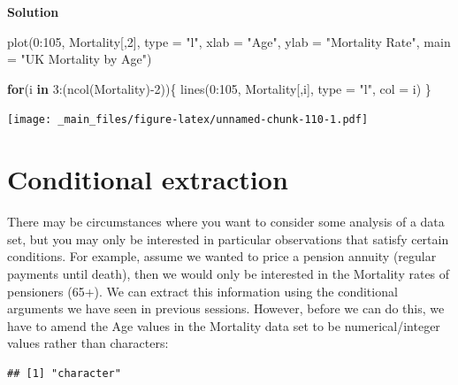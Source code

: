 \documentclass[
]{book}
\newenvironment{Shaded}{\begin{snugshade}}{\end{snugshade}}
\newcommand{\AttributeTok}[1]{\textcolor[rgb]{0.77,0.63,0.00}{#1}}
\newcommand{\ControlFlowTok}[1]{\textcolor[rgb]{0.13,0.29,0.53}{\textbf{#1}}}
\newcommand{\DecValTok}[1]{\textcolor[rgb]{0.00,0.00,0.81}{#1}}
\newcommand{\FunctionTok}[1]{\textcolor[rgb]{0.00,0.00,0.00}{#1}}
\newcommand{\NormalTok}[1]{#1}
\newcommand{\SpecialCharTok}[1]{\textcolor[rgb]{0.00,0.00,0.00}{#1}}
\newcommand{\StringTok}[1]{\textcolor[rgb]{0.31,0.60,0.02}{#1}}
\theoremstyle{definition}
\theoremstyle{definition}
\theoremstyle{definition}
\theoremstyle{definition}
\theoremstyle{remark}
\begin{document}
\textbf{Solution}

\begin{Shaded}
\begin{Highlighting}[]
\FunctionTok{plot}\NormalTok{(}\DecValTok{0}\SpecialCharTok{:}\DecValTok{105}\NormalTok{, Mortality[,}\DecValTok{2}\NormalTok{], }\AttributeTok{type =} \StringTok{"l"}\NormalTok{, }\AttributeTok{xlab =} \StringTok{"Age"}\NormalTok{, }\AttributeTok{ylab =} \StringTok{"Mortality Rate"}\NormalTok{, }\AttributeTok{main =} \StringTok{"UK Mortality by Age"}\NormalTok{)}

\ControlFlowTok{for}\NormalTok{(i }\ControlFlowTok{in} \DecValTok{3}\SpecialCharTok{:}\NormalTok{(}\FunctionTok{ncol}\NormalTok{(Mortality)}\SpecialCharTok{{-}}\DecValTok{2}\NormalTok{))\{}
  \FunctionTok{lines}\NormalTok{(}\DecValTok{0}\SpecialCharTok{:}\DecValTok{105}\NormalTok{, Mortality[,i], }\AttributeTok{type =} \StringTok{"l"}\NormalTok{, }\AttributeTok{col =}\NormalTok{ i)}
\NormalTok{\}}
\end{Highlighting}
\end{Shaded}

\texttt{[image: \_main\_files/figure-latex/unnamed-chunk-110-1.pdf]}

\hypertarget{conditional-extraction}{%
\section{Conditional extraction}\label{conditional-extraction}}

There may be circumstances where you want to consider some analysis of a data set, but you may only be interested in particular observations that satisfy certain conditions. For example, assume we wanted to price a pension annuity (regular payments until death), then we would only be interested in the Mortality rates of pensioners (65+). We can extract this information using the conditional arguments we have seen in previous sessions. However, before we can do this, we have to amend the Age values in the Mortality data set to be numerical/integer values rather than characters:

\begin{Shaded}
\end{Shaded}

\begin{verbatim}
## [1] "character"
\end{verbatim}
\end{document}
